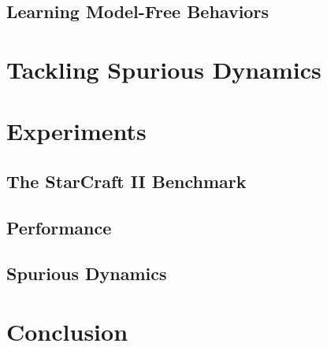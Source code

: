 \documentclass{article}
\begin{document}
\begin{multicols}{2}
\subsection{Learning Model-Free Behaviors}

\section{Tackling Spurious Dynamics}




\section{Experiments}

\subsection{The StarCraft II Benchmark}

\subsection{Performance}

\subsection{Spurious Dynamics}


\section{Conclusion}


 
\footnotesize{}
\end{multicols}

\end{document}
